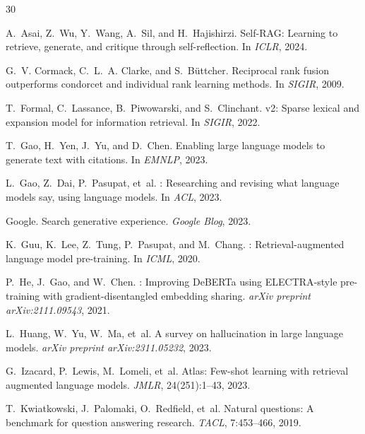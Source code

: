 
\begin{thebibliography}{30}

A.~Asai, Z.~Wu, Y.~Wang, A.~Sil, and H.~Hajishirzi.
\newblock Self-{RAG}: Learning to retrieve, generate, and critique through self-reflection.
\newblock In \emph{ICLR}, 2024.

G.~V. Cormack, C.~L.~A. Clarke, and S.~B\"uttcher.
\newblock Reciprocal rank fusion outperforms condorcet and individual rank learning methods.
\newblock In \emph{SIGIR}, 2009.

T.~Formal, C.~Lassance, B.~Piwowarski, and S.~Clinchant.
 v2: Sparse lexical and expansion model for information retrieval.
\newblock In \emph{SIGIR}, 2022.

T.~Gao, H.~Yen, J.~Yu, and D.~Chen.
\newblock Enabling large language models to generate text with citations.
\newblock In \emph{EMNLP}, 2023.

L.~Gao, Z.~Dai, P.~Pasupat, et~al.
: Researching and revising what language models say, using language models.
\newblock In \emph{ACL}, 2023.

Google.
\newblock Search generative experience.
\newblock \emph{Google Blog}, 2023.

K.~Guu, K.~Lee, Z.~Tung, P.~Pasupat, and M.~Chang.
: Retrieval-augmented language model pre-training.
\newblock In \emph{ICML}, 2020.

P.~He, J.~Gao, and W.~Chen.
: Improving {DeBERTa} using {ELECTRA}-style pre-training with gradient-disentangled embedding sharing.
\newblock \emph{arXiv preprint arXiv:2111.09543}, 2021.

L.~Huang, W.~Yu, W.~Ma, et~al.
\newblock A survey on hallucination in large language models.
\newblock \emph{arXiv preprint arXiv:2311.05232}, 2023.

G.~Izacard, P.~Lewis, M.~Lomeli, et~al.
\newblock Atlas: Few-shot learning with retrieval augmented language models.
\newblock \emph{JMLR}, 24(251):1--43, 2023.

T.~Kwiatkowski, J.~Palomaki, O.~Redfield, et~al.
\newblock Natural questions: A benchmark for question answering research.
\newblock \emph{TACL}, 7:453--466, 2019.


\end{thebibliography}
